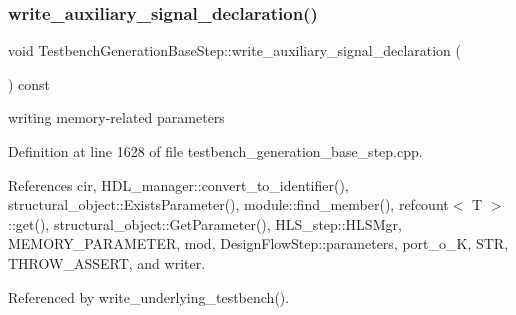 \subsubsection{\texorpdfstring{write\+\_\+auxiliary\+\_\+signal\+\_\+declaration()}{write\_auxiliary\_signal\_declaration()}}
{\footnotesize\ttfamily void Testbench\+Generation\+Base\+Step\+::write\+\_\+auxiliary\+\_\+signal\+\_\+declaration (\begin{DoxyParamCaption}{ }\end{DoxyParamCaption}) const\hspace{0.3cm}{\ttfamily [protected]}}

writing memory-\/related parameters 

Definition at line 1628 of file testbench\+\_\+generation\+\_\+base\+\_\+step.\+cpp.



References cir, H\+D\+L\+\_\+manager\+::convert\+\_\+to\+\_\+identifier(), structural\+\_\+object\+::\+Exists\+Parameter(), module\+::find\+\_\+member(), refcount$<$ T $>$\+::get(), structural\+\_\+object\+::\+Get\+Parameter(), H\+L\+S\+\_\+step\+::\+H\+L\+S\+Mgr, M\+E\+M\+O\+R\+Y\+\_\+\+P\+A\+R\+A\+M\+E\+T\+ER, mod, Design\+Flow\+Step\+::parameters, port\+\_\+o\+\_\+K, S\+TR, T\+H\+R\+O\+W\+\_\+\+A\+S\+S\+E\+RT, and writer.



Referenced by write\+\_\+underlying\+\_\+testbench().


